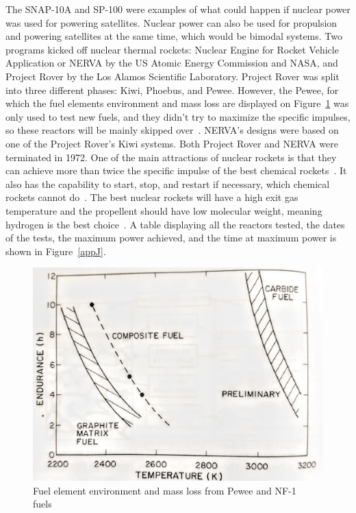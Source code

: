 \documentclass{article}
\begin{document}
The SNAP-10A and SP-100 were examples of what could happen if nuclear power was used for powering satellites. Nuclear power can also be used for propulsion and powering satellites at the same time, which would be bimodal systems. Two programs kicked off nuclear thermal rockets: Nuclear Engine for Rocket Vehicle Application or NERVA by the US Atomic Energy Commission and NASA, and Project Rover by the Los Alamos Scientific Laboratory. Project Rover was split into three different phases: Kiwi, Phoebus, and Pewee. However, the Pewee, for which the fuel elements environment and mass loss are displayed on Figure~\ref{appV} was only used to test new fuels, and they didn't try to maximize the specific impulses, so these reactors will be mainly skipped over~\cite{finseth1991rover}. NERVA's designs were based on one of the Project Rover's Kiwi systems. Both Project Rover and NERVA were terminated in 1972. One of the main attractions of nuclear rockets is that they can achieve more than twice the specific impulse of the best chemical rockets~\cite{finseth1991rover}. It also has the capability to start, stop, and restart if necessary, which chemical rockets cannot do~\cite{finseth1991rover}. The best nuclear rockets will have a high exit gas temperature and the propellent should have low molecular weight, meaning hydrogen is the best choice~\cite{finseth1991rover}. A table displaying all the reactors tested, the dates of the tests, the maximum power achieved, and the time at maximum power is shown in Figure~\ref{appJ}.

\begin{figure}[]
	\centering
	\includegraphics[height=0.45\textheight]{fig/appV}
	\caption[Fuel element environment and mass loss from Pewee and NF-1 fuels]{Fuel element environment and mass loss from Pewee and NF-1 fuels~\cite{lyon1973performance}}
	\label{appV}
\end{figure}
\end{document}

